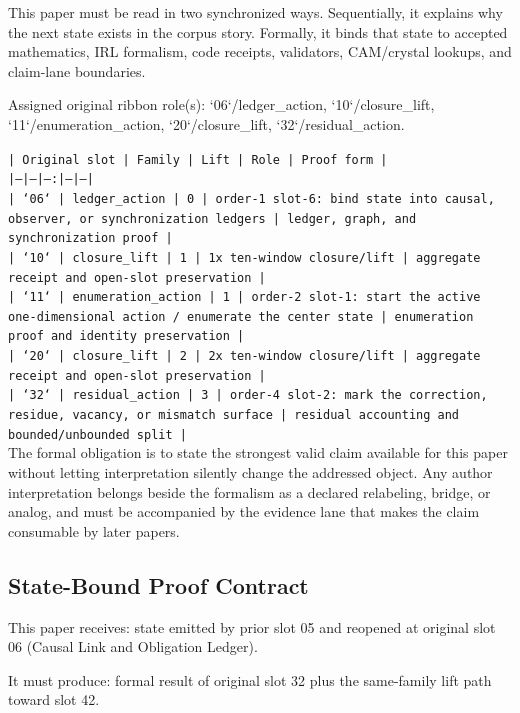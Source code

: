 \documentclass[11pt]{article}
\begin{document}
This paper must be read in two synchronized ways. Sequentially, it explains why
the next state exists in the corpus story. Formally, it binds that state to
accepted mathematics, IRL formalism, code receipts, validators, CAM/crystal
lookups, and claim-lane boundaries.

Assigned original ribbon role(s): `06`/ledger\_action, `10`/closure\_lift, `11`/enumeration\_action, `20`/closure\_lift, `32`/residual\_action.

\noindent\texttt{| Original slot | Family | Lift | Role | Proof form |}\\
\noindent\texttt{|---|---|---:|---|---|}\\
\noindent\texttt{| `06` | ledger\_action | 0 | order-1 slot-6: bind state into causal, observer, or synchronization ledgers | ledger, graph, and synchronization proof |}\\
\noindent\texttt{| `10` | closure\_lift | 1 | 1x ten-window closure/lift | aggregate receipt and open-slot preservation |}\\
\noindent\texttt{| `11` | enumeration\_action | 1 | order-2 slot-1: start the active one-dimensional action / enumerate the center state | enumeration proof and identity preservation |}\\
\noindent\texttt{| `20` | closure\_lift | 2 | 2x ten-window closure/lift | aggregate receipt and open-slot preservation |}\\
\noindent\texttt{| `32` | residual\_action | 3 | order-4 slot-2: mark the correction, residue, vacancy, or mismatch surface | residual accounting and bounded/unbounded split |}\\

The formal obligation is to state the strongest valid claim available for this
paper without letting interpretation silently change the addressed object. Any
author interpretation belongs beside the formalism as a declared relabeling,
bridge, or analog, and must be accompanied by the evidence lane that makes the
claim consumable by later papers.

\subsection*{State-Bound Proof Contract}

This paper receives: state emitted by prior slot 05 and reopened at original slot 06 (Causal Link and Obligation Ledger).

It must produce: formal result of original slot 32 plus the same-family lift path toward slot 42.
\end{document}
